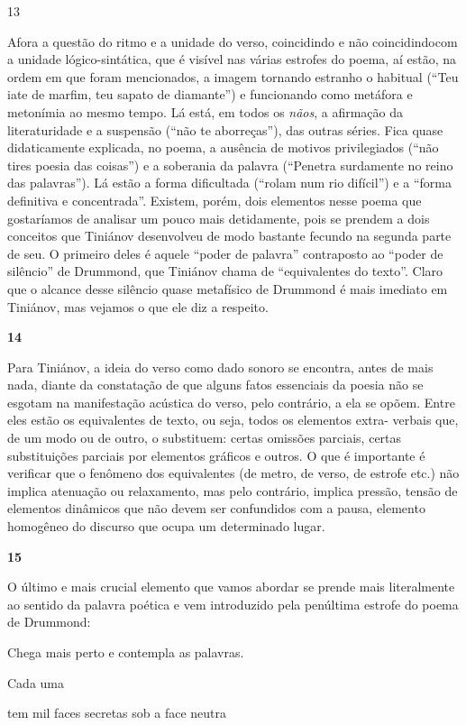 13

Afora a questão do ritmo e a unidade do verso, coincidindo e não
coincidindocom a unidade lógico-sintática, que é visível nas várias
estrofes do poema, aí estão, na ordem em que foram mencionados, a imagem
tornando estranho o habitual (``Teu iate de marfim, teu sapato de
diamante'') e funcionando como metáfora e metonímia ao mesmo tempo. Lá
está, em todos os \emph{nãos}, a afirmação da literaturidade e a
suspensão (``não te aborreças''), das outras séries. Fica quase
didaticamente explicada, no poema, a ausência de motivos privilegiados
(``não tires poesia das coisas'') e a soberania da palavra (``Penetra
surdamente no reino das palavras''). Lá estão a forma dificultada
(``rolam num rio difícil'') e a ``forma definitiva e concentrada''.
Existem, porém, dois elementos nesse poema que gostaríamos de analisar
um pouco mais detidamente, pois se prendem a dois conceitos que Tiniánov
desenvolveu de modo bastante fecundo na segunda parte de seu. O primeiro
deles é aquele ``poder de palavra'' contraposto ao ``poder de silêncio''
de Drummond, que Tiniánov chama de ``equivalentes do texto''. Claro que
o alcance desse silêncio quase metafísico de Drummond é mais imediato em
Tiniánov, mas vejamos o que ele diz a respeito.

\textbf{14}

Para Tiniánov, a ideia do verso como dado sonoro se encontra, antes de
mais nada, diante da constatação de que alguns fatos essenciais da
poesia não se esgotam na manifestação acústica do verso, pelo contrário,
a ela se opõem. Entre eles estão os equivalentes de texto, ou seja,
todos os elementos extra- verbais que, de um modo ou de outro, o
substituem: certas omissões parciais, certas substituições parciais por
elementos gráficos e outros. O que é importante é verificar que o
fenômeno dos equivalentes (de metro, de verso, de estrofe etc.) não
implica atenuação ou relaxamento, mas pelo contrário, implica pressão,
tensão de elementos dinâmicos que não devem ser confundidos com a pausa,
elemento homogêneo do discurso que ocupa um determinado lugar.

\textbf{15}

O último e mais crucial elemento que vamos abordar se prende mais
literalmente ao sentido da palavra poética e vem introduzido pela
penúltima estrofe do poema de Drummond:

Chega mais perto e contempla as palavras.

Cada uma

tem mil faces secretas sob a face neutra

